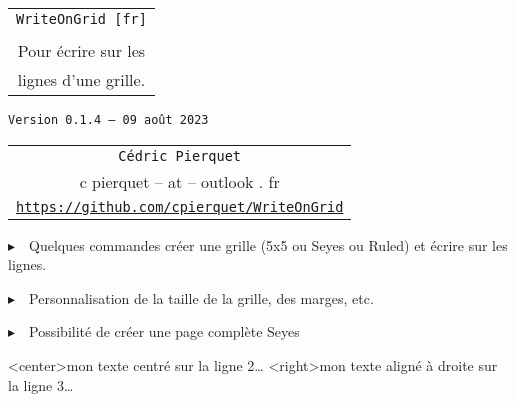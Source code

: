\documentclass[a4paper]{article}
\def\TPversion{0.1.4}
\def\TPdate{09 août 2023}
\begin{document}
\pagestyle{fancy}

\thispagestyle{empty}

\vspace{2cm}

\begin{center}
	\begin{minipage}{0.75\linewidth}
	\begin{tcolorbox}[colframe=yellow,colback=yellow!15]
		\begin{center}
			\begin{tabular}{c}
				{\Huge \texttt{WriteOnGrid [fr]}}\\
				\\
				{\LARGE Pour écrire sur les} \\
				{\LARGE lignes d'une grille.}
			\end{tabular}
			
			\medskip
			
			{\small \texttt{Version \TPversion{} -- \TPdate}}
		\end{center}
	\end{tcolorbox}
\end{minipage}
\end{center}

\vspace{0.5cm}

\begin{center}
	\begin{tabular}{c}
	\texttt{Cédric Pierquet}\\
	{\ttfamily c pierquet -- at -- outlook . fr}\\
	\texttt{\url{https://github.com/cpierquet/WriteOnGrid}}
\end{tabular}
\end{center}

\vspace{0.5cm}

{$\blacktriangleright$~~Quelques commandes créer une grille (5x5 ou Seyes ou Ruled) et écrire \og sur \fg{} les lignes.}

\smallskip

{$\blacktriangleright$~~Personnalisation de la taille de la grille, des marges, etc.}

\smallskip

{$\blacktriangleright$~~Possibilité de créer une page complète Seyes}

\vspace{1cm}

\begin{center}
	\begin{EnvQuadrillage}[NbCarreaux=22x8]
	\EcrireLigne<center>{mon texte centré sur la ligne 2\ldots}
	\EcrireLigne<right>{mon texte aligné à droite sur la ligne 3\ldots}
	\PasseLigne
\end{EnvQuadrillage}
\end{center}
\end{document}
